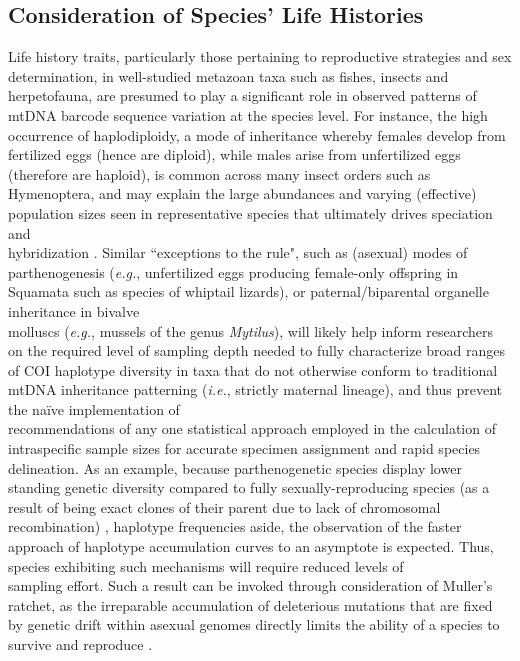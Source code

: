 \subsection{Consideration of Species' Life Histories}

Life history traits, particularly those pertaining to reproductive strategies and sex \\ determination, in well-studied metazoan taxa such as fishes, insects and herpetofauna, are presumed to play a significant role in observed patterns of mtDNA barcode sequence variation at the species level. For instance, the high occurrence of haplodiploidy, a mode of inheritance whereby females develop from fertilized eggs (hence are diploid), while males arise from unfertilized eggs (therefore are haploid), is common across many insect orders such as Hymenoptera, and may explain the large abundances and varying (effective) population sizes seen in representative species that ultimately drives speciation and \\ hybridization \cite{hebert2016counting}. Similar ``exceptions to the rule", such as (asexual) modes of \\ parthenogenesis (\textit{e.g.}, unfertilized eggs producing female-only offspring in Squamata such as species of whiptail lizards), or paternal/biparental organelle inheritance in bivalve \\ molluscs (\textit{e.g.}, mussels of the genus \textit{Mytilus}), will likely help inform researchers on the required level of sampling depth needed to fully characterize broad ranges of COI haplotype diversity in taxa that do not otherwise conform to traditional mtDNA inheritance patterning (\textit{i.e.}, strictly maternal lineage), and thus prevent the na\"ive implementation of \\ recommendations of any one statistical approach employed in the calculation of \\ intraspecific sample sizes for accurate specimen assignment and rapid species delineation. As an example, because parthenogenetic species display lower standing genetic diversity compared to fully sexually-reproducing species (as a result of being exact clones of their parent due to lack of chromosomal recombination) \cite{bengtsson2003genetic}, haplotype frequencies aside, the observation of the faster approach of haplotype accumulation curves to an asymptote is expected. Thus, species exhibiting such mechanisms will require reduced levels of \\ sampling effort. Such a result can be invoked through consideration of Muller's ratchet, as the irreparable accumulation of deleterious mutations that are fixed by genetic drift within asexual genomes directly limits the ability of a species to survive and reproduce \cite{felenstein1974evolutionary, muller1964relation}. 


